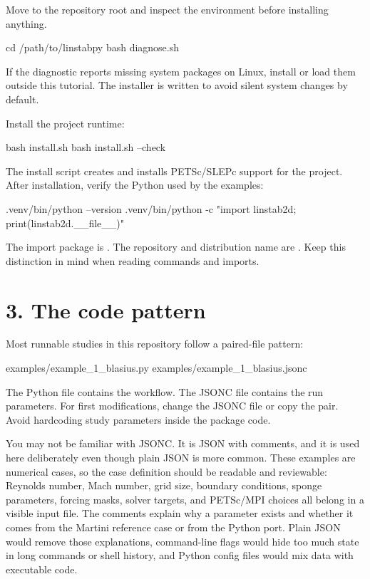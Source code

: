 \documentclass[11pt,a4paper]{article}
\newcommand{\code}[1]{\texttt{\detokenize{#1}}}
\begin{document}
Move to the repository root and inspect the environment before installing anything.

\begin{commandbox}
cd /path/to/linstabpy
bash diagnose.sh
\end{commandbox}

If the diagnostic reports missing system packages on Linux, install or load them outside this tutorial. The installer is written to avoid silent system changes by default.

Install the project runtime:

\begin{commandbox}
bash install.sh
bash install.sh --check
\end{commandbox}

The install script creates  and installs PETSc/SLEPc support for the project. After installation, verify the Python used by the examples:

\begin{commandbox}
.venv/bin/python --version
.venv/bin/python -c "import linstab2d; print(linstab2d.__file__)"
\end{commandbox}

\begin{notebox}
The import package is \code{linstab2d}. The repository and distribution name are \code{linstabpy}. Keep this distinction in mind when reading commands and imports.
\end{notebox}

\section*{3. The code pattern}

Most runnable studies in this repository follow a paired-file pattern:

\begin{outputbox}
examples/example_1_blasius.py
examples/example_1_blasius.jsonc
\end{outputbox}

The Python file contains the workflow. The JSONC file contains the run parameters. For first modifications, change the JSONC file or copy the pair. Avoid hardcoding study parameters inside the package code.

\begin{notebox}
You may not be familiar with JSONC. It is JSON with comments, and it is used here deliberately even though plain JSON is more common. These examples are numerical cases, so the case definition should be readable and reviewable: Reynolds number, Mach number, grid size, boundary conditions, sponge parameters, forcing masks, solver targets, and PETSc/MPI choices all belong in a visible input file. The comments explain why a parameter exists and whether it comes from the Martini reference case or from the Python port. Plain JSON would remove those explanations, command-line flags would hide too much state in long commands or shell history, and Python config files would mix data with executable code.
\end{notebox}
\end{document}

